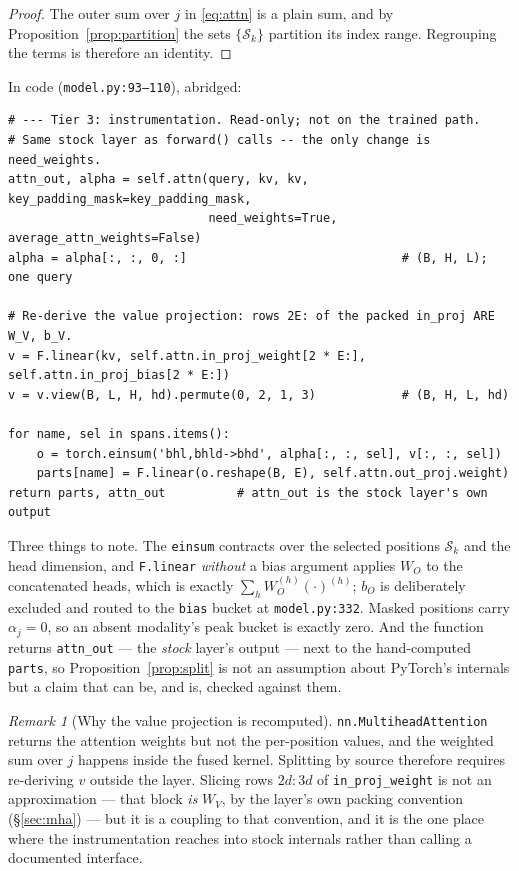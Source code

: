\documentclass[11pt]{article}
\theoremstyle{plain}
\theoremstyle{remark}
\newtheorem*{remark}{Remark}
\newcommand{\Sset}{\mathcal{S}}
\newcommand{\code}[1]{\texttt{\small #1}}
\begin{document}
\begin{proof}
The outer sum over $j$ in \eqref{eq:attn} is a plain sum, and by
Proposition~\ref{prop:partition} the sets $\{\Sset_k\}$ partition its index
range. Regrouping the terms is therefore an identity.
\end{proof}

\noindent
In code (\code{model.py:93--110}), abridged:

\begin{lstlisting}
# --- Tier 3: instrumentation. Read-only; not on the trained path.
# Same stock layer as forward() calls -- the only change is need_weights.
attn_out, alpha = self.attn(query, kv, kv, key_padding_mask=key_padding_mask,
                            need_weights=True, average_attn_weights=False)
alpha = alpha[:, :, 0, :]                              # (B, H, L); one query

# Re-derive the value projection: rows 2E: of the packed in_proj ARE W_V, b_V.
v = F.linear(kv, self.attn.in_proj_weight[2 * E:], self.attn.in_proj_bias[2 * E:])
v = v.view(B, L, H, hd).permute(0, 2, 1, 3)            # (B, H, L, hd)

for name, sel in spans.items():
    o = torch.einsum('bhl,bhld->bhd', alpha[:, :, sel], v[:, :, sel])
    parts[name] = F.linear(o.reshape(B, E), self.attn.out_proj.weight)
return parts, attn_out          # attn_out is the stock layer's own output
\end{lstlisting}

\noindent
Three things to note. The \code{einsum} contracts over the selected positions
$\Sset_k$ and the head dimension, and \code{F.linear} \emph{without} a bias
argument applies $W_O$ to the concatenated heads, which is exactly
$\sum_h W_O^{(h)}(\cdot)^{(h)}$; $b_O$ is deliberately excluded and routed to
the \code{bias} bucket at \code{model.py:332}. Masked positions carry
$\alpha_j = 0$, so an absent modality's peak bucket is exactly zero. And the
function returns \code{attn\_out} --- the \emph{stock} layer's output --- next
to the hand-computed \code{parts}, so Proposition~\ref{prop:split} is not an
assumption about PyTorch's internals but a claim that can be, and is, checked
against them.

\begin{remark}[Why the value projection is recomputed]
\code{nn.MultiheadAttention} returns the attention weights but not the
per-position values, and the weighted sum over $j$ happens inside the fused
kernel. Splitting by source therefore requires re-deriving $v$ outside the
layer. Slicing rows $2d{:}3d$ of \code{in\_proj\_weight} is not an
approximation --- that block \emph{is} $W_V$, by the layer's own packing
convention (\S\ref{sec:mha}) --- but it is a coupling to that convention, and
it is the one place where the instrumentation reaches into stock internals
rather than calling a documented interface.
\end{remark}
\end{document}
